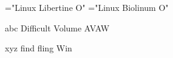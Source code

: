 



\font\llrm="Linux Libertine O"
\font\lbsf="Linux Biolinum O"

{\llrm abc Difficult Volume AVAW}

{\lbsf xyz find fling Win}

\bye